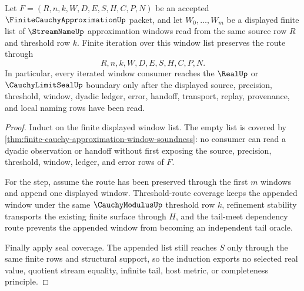 \begin{theorem}
\label{thm:finite-cauchy-approximation-window-induction}
Let $F=(R,n,k,W,D,E,S,H,C,P,N)$ be an accepted $\FiniteCauchyApproximationUp$ packet, and let $W_{0},\ldots,W_{m}$ be a displayed finite list of $\StreamNameUp$ approximation windows read from the same source row $R$ and threshold row $k$. Finite iteration over this window list preserves the route through
$$
R,n,k,W,D,E,S,H,C,P,N .
$$
In particular, every iterated window consumer reaches the $\RealUp$ or $\CauchyLimitSealUp$ boundary only after the displayed source, precision, threshold, window, dyadic ledger, error, handoff, transport, replay, provenance, and local naming rows have been read.
\end{theorem}
\begin{proof}
Induct on the finite displayed window list. The empty list is covered by \autoref{thm:finite-cauchy-approximation-window-soundness}: no consumer can read a dyadic observation or handoff without first exposing the source, precision, threshold, window, ledger, and error rows of $F$.

For the step, assume the route has been preserved through the first $m$ windows and append one displayed window. Threshold-route coverage keeps the appended window under the same $\CauchyModulusUp$ threshold row $k$, refinement stability transports the existing finite surface through $H$, and the tail-meet dependency route prevents the appended window from becoming an independent tail oracle.

Finally apply seal coverage. The appended list still reaches $S$ only through the same finite rows and structural support, so the induction exports no selected real value, quotient stream equality, infinite tail, host metric, or completeness principle.
\end{proof}

